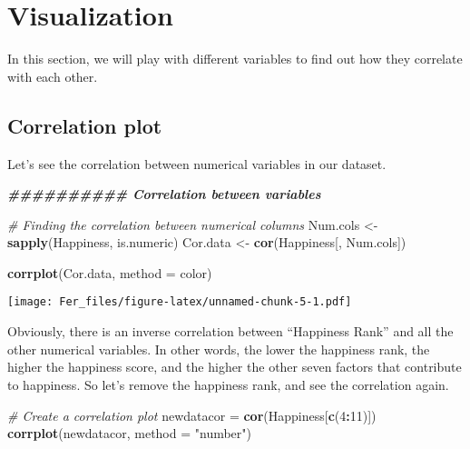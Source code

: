 \documentclass[
]{article}
\newenvironment{Shaded}{\begin{snugshade}}{\end{snugshade}}
\newcommand{\AttributeTok}[1]{\textcolor[rgb]{0.13,0.29,0.53}{#1}}
\newcommand{\CommentTok}[1]{\textcolor[rgb]{0.56,0.35,0.01}{\textit{#1}}}
\newcommand{\DecValTok}[1]{\textcolor[rgb]{0.00,0.00,0.81}{#1}}
\newcommand{\DocumentationTok}[1]{\textcolor[rgb]{0.56,0.35,0.01}{\textbf{\textit{#1}}}}
\newcommand{\FunctionTok}[1]{\textcolor[rgb]{0.13,0.29,0.53}{\textbf{#1}}}
\newcommand{\NormalTok}[1]{#1}
\newcommand{\OtherTok}[1]{\textcolor[rgb]{0.56,0.35,0.01}{#1}}
\newcommand{\SpecialCharTok}[1]{\textcolor[rgb]{0.81,0.36,0.00}{\textbf{#1}}}
\newcommand{\StringTok}[1]{\textcolor[rgb]{0.31,0.60,0.02}{#1}}
\begin{document}
\section{Visualization}\label{visualization}

In this section, we will play with different variables to find out how
they correlate with each other.

\subsection{Correlation plot}\label{correlation-plot}

Let's see the correlation between numerical variables in our dataset.

\begin{Shaded}
\begin{Highlighting}[]
\DocumentationTok{\#\#\#\#\#\#\#\#\#\# Correlation between variables}

\CommentTok{\# Finding the correlation between numerical columns}
\NormalTok{Num.cols }\OtherTok{\textless{}{-}} \FunctionTok{sapply}\NormalTok{(Happiness, is.numeric)}
\NormalTok{Cor.data }\OtherTok{\textless{}{-}} \FunctionTok{cor}\NormalTok{(Happiness[, Num.cols])}

\FunctionTok{corrplot}\NormalTok{(Cor.data, }\AttributeTok{method =} \StringTok{\textquotesingle{}color\textquotesingle{}}\NormalTok{)  }
\end{Highlighting}
\end{Shaded}

\texttt{[image: Fer\_files/figure-latex/unnamed-chunk-5-1.pdf]}

Obviously, there is an inverse correlation between ``Happiness Rank''
and all the other numerical variables. In other words, the lower the
happiness rank, the higher the happiness score, and the higher the other
seven factors that contribute to happiness. So let's remove the
happiness rank, and see the correlation again.

\begin{Shaded}
\begin{Highlighting}[]
\CommentTok{\# Create a correlation plot}
\NormalTok{newdatacor }\OtherTok{=} \FunctionTok{cor}\NormalTok{(Happiness[}\FunctionTok{c}\NormalTok{(}\DecValTok{4}\SpecialCharTok{:}\DecValTok{11}\NormalTok{)])}
\FunctionTok{corrplot}\NormalTok{(newdatacor, }\AttributeTok{method =} \StringTok{"number"}\NormalTok{)}
\end{Highlighting}
\end{Shaded}
\end{document}
